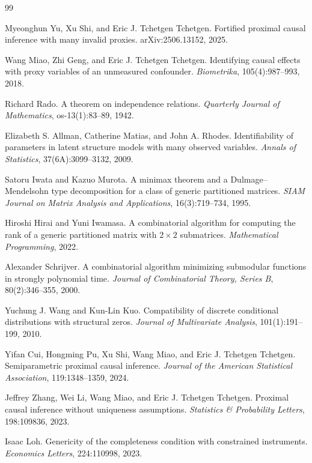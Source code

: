 \documentclass{article}
\begin{document}
\begin{thebibliography}{99}

   Myeonghun Yu, Xu Shi, and Eric J. Tchetgen Tchetgen. Fortified proximal causal inference with many invalid proxies. arXiv:2506.13152, 2025.

   Wang Miao, Zhi Geng, and Eric J. Tchetgen Tchetgen. Identifying causal effects with proxy variables of an unmeasured confounder. \emph{Biometrika}, 105(4):987--993, 2018.

   Richard Rado. A theorem on independence relations. \emph{Quarterly Journal of Mathematics}, os-13(1):83--89, 1942.

   Elizabeth S. Allman, Catherine Matias, and John A. Rhodes. Identifiability of parameters in latent structure models with many observed variables. \emph{Annals of Statistics}, 37(6A):3099--3132, 2009.

   Satoru Iwata and Kazuo Murota. A minimax theorem and a Dulmage--Mendelsohn type decomposition for a class of generic partitioned matrices. \emph{SIAM Journal on Matrix Analysis and Applications}, 16(3):719--734, 1995.

   Hiroshi Hirai and Yuni Iwamasa. A combinatorial algorithm for computing the rank of a generic partitioned matrix with \(2\times2\) submatrices. \emph{Mathematical Programming}, 2022.

   Alexander Schrijver. A combinatorial algorithm minimizing submodular functions in strongly polynomial time. \emph{Journal of Combinatorial Theory, Series B}, 80(2):346--355, 2000.

   Yuchung J. Wang and Kun-Lin Kuo. Compatibility of discrete conditional distributions with structural zeros. \emph{Journal of Multivariate Analysis}, 101(1):191--199, 2010.

   Yifan Cui, Hongming Pu, Xu Shi, Wang Miao, and Eric J. Tchetgen Tchetgen. Semiparametric proximal causal inference. \emph{Journal of the American Statistical Association}, 119:1348--1359, 2024.

   Jeffrey Zhang, Wei Li, Wang Miao, and Eric J. Tchetgen Tchetgen. Proximal causal inference without uniqueness assumptions. \emph{Statistics \& Probability Letters}, 198:109836, 2023.

   Isaac Loh. Genericity of the completeness condition with constrained instruments. \emph{Economics Letters}, 224:110998, 2023.

\end{thebibliography}
\end{document}

